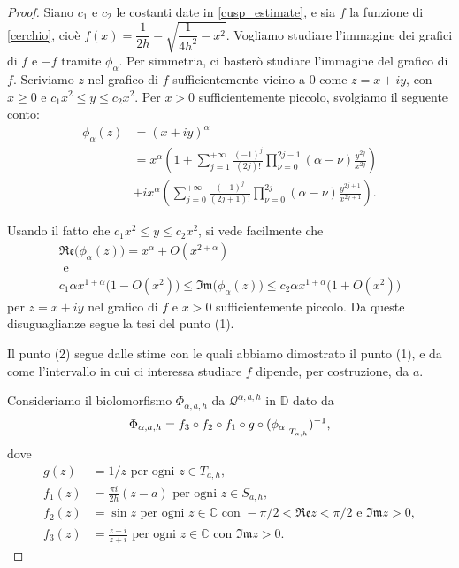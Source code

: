 \begin{proof}
    Siano $c_1$ e $c_2$ le costanti date in \eqref{cusp_estimate}, e sia $f$ la funzione di \eqref{cerchio}, cioè $f(x)=\dfrac{1}{2h}-\sqrt{\dfrac{1}{4h^2}-x^2}$. Vogliamo studiare l'immagine dei grafici di $f$ e $-f$ tramite $\phi_\alpha$. Per simmetria, ci basterò studiare l'immagine del grafico di $f$. Scriviamo $z$ nel grafico di $f$ sufficientemente vicino a $0$ come $z=x+iy$, con $x \ge 0$ e $c_1x^2\le y\le c_2x^2$. Per $x>0$ sufficientemente piccolo, svolgiamo il seguente conto:
    \begin{align*}
        \phi_\alpha(z)&=(x+iy)^{\alpha}\\
        &=x^{\alpha}\left(1+\sum_{j=1}^{+\infty}\frac{(-1)^j}{(2j)!}\prod_{\nu=0}^{2j-1}(\alpha-\nu)\frac{y^{2j}}{x^{2j}}\right)\\
        &+ix^{\alpha}\left(\sum_{j=0}^{+\infty}\frac{(-1)^j}{(2j+1)!}\prod_{\nu=0}^{2j}(\alpha-\nu)\frac{y^{2j+1}}{x^{2j+1}}\right).
    \end{align*}

    Usando il fatto che $c_1x^2\le y\le c_2x^2$, si vede facilmente che
    \begin{gather*}
        \mathfrak{Re}\big(\phi_\alpha(z)\big)=x^\alpha+O(x^{2+\alpha})\\
        \text{ e }\\
        c_1\alpha x^{1+\alpha}\big(1-O(x^2)\big) \le \mathfrak{Im}\big(\phi_\alpha(z)\big) \le c_2\alpha x^{1+\alpha}\big(1+O(x^2)\big)
    \end{gather*}
    per $z=x+iy$ nel grafico di $f$ e $x>0$ sufficientemente piccolo. Da queste disuguaglianze segue la tesi del punto (1).

    Il punto (2) segue dalle stime con le quali abbiamo dimostrato il punto (1), e da come l'intervallo in cui ci interessa studiare $f$ dipende, per costruzione, da $a$.

    Consideriamo il biolomorfismo $\Phi_{\alpha,a,h}$ da $\mathcal{Q}^{\alpha,a,h}$ in $\mathbb{D}$ dato da
    $$\Phi_{\alpha,a,h}=f_3\circ f_2\circ f_1\circ g\circ(\phi_\alpha\restrict{T_{a,h}})^{-1},$$
    dove
    \begin{align*}
        g(z)&=1/z\text{ per ogni }z\in T_{a,h},\\
        f_1(z)&=\frac{\pi i}{2h}(z-a)\text{ per ogni }z\in S_{a,h},\\
        f_2(z)&=\sin{z}\text{ per ogni }z\in \mathbb{C}\text{ con }-\pi/2<\mathfrak{Re}z<\pi/2\text{ e }\mathfrak{Im}z>0,\\
        f_3(z)&=\frac{z-i}{z+i}\text{ per ogni }z\in\mathbb{C}\text{ con }\mathfrak{Im}z>0.
    \end{align*}


\end{proof}
